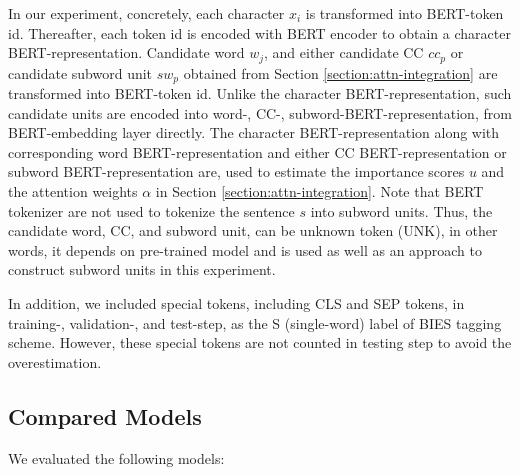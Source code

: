 In our experiment, concretely, each character $x_{i}$ is transformed into BERT-token id.
%
Thereafter, each token id is encoded with BERT encoder to obtain a character BERT-representation.
%
Candidate word $w_{j}$, and either candidate CC $cc_{p}$ or candidate subword unit $sw_{p}$ obtained from Section \ref{section:attn-integration} are transformed into BERT-token id.
%
Unlike the character BERT-representation, such candidate units are encoded into word-, CC-, subword-BERT-representation, from BERT-embedding layer directly.
%
The character BERT-representation along with corresponding word BERT-representation and either CC BERT-representation or subword BERT-representation are, used to estimate the importance scores $u$ and the attention weights $\alpha$ in Section \ref{section:attn-integration}.
%
Note that BERT tokenizer are not used to tokenize the sentence $s$ into subword units.
%
Thus, the candidate word, CC, and subword unit, can be unknown token (UNK), in other words, it depends on pre-trained model and is used as well as an approach to construct subword units in this experiment.
%

In addition, we included special tokens, including CLS and SEP tokens, in training-, validation-, and test-step, as the S (single-word) label of BIES tagging scheme.
%
However, these special tokens are not counted in testing step to avoid the overestimation.

\subsection{Compared Models}
%
We evaluated the following models:

